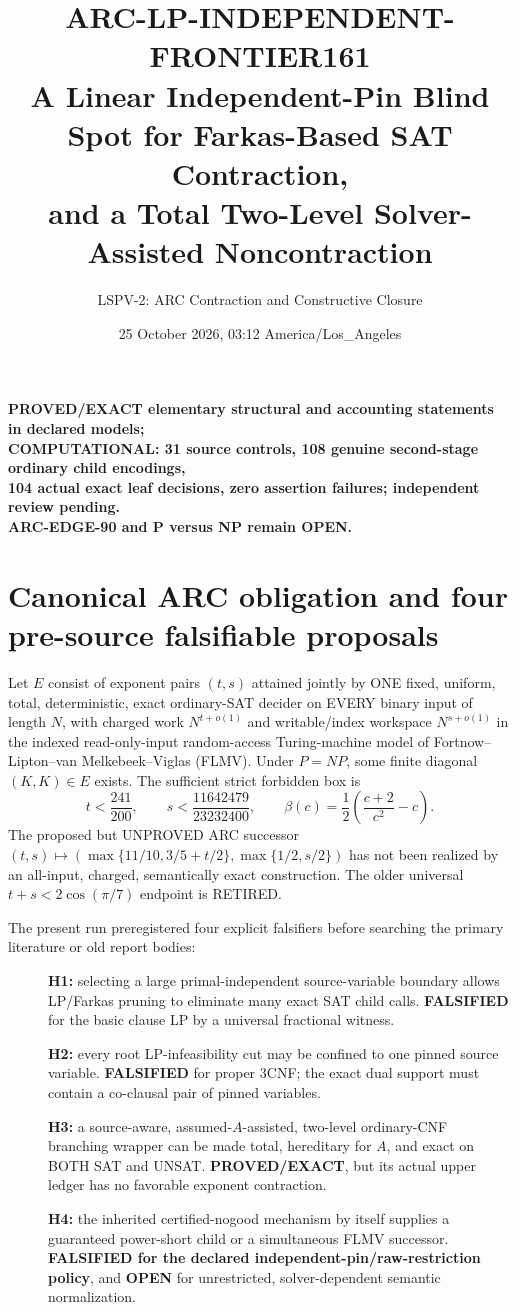 \documentclass[11pt]{article}
\title{ARC-LP-INDEPENDENT-FRONTIER161\\
\large A Linear Independent-Pin Blind Spot for Farkas-Based SAT Contraction,\\
and a Total Two-Level Solver-Assisted Noncontraction}
\author{LSPV-2: ARC Contraction and Constructive Closure}
\date{25 October 2026, 03:12 America/Los\_Angeles}
\begin{document}
\maketitle
\begin{center}
\textbf{PROVED/EXACT elementary structural and accounting statements in declared models;}\\
\textbf{COMPUTATIONAL: 31 source controls, 108 genuine second-stage ordinary child encodings,}\\
\textbf{104 actual exact leaf decisions, zero assertion failures; independent review pending.}\\
\textbf{ARC-EDGE-90 and P versus NP remain OPEN.}
\end{center}

\section{Canonical ARC obligation and four pre-source falsifiable proposals}
Let \(E\) consist of exponent pairs \((t,s)\) attained jointly by ONE fixed,
uniform, total, deterministic, exact ordinary-SAT decider on EVERY binary
input of length \(N\), with charged work \(N^{t+o(1)}\) and writable/index
workspace \(N^{s+o(1)}\) in the indexed read-only-input random-access
Turing-machine model of Fortnow--Lipton--van Melkebeek--Viglas
(FLMV). Under \(P=NP\), some finite diagonal \((K,K)\in E\) exists.
The sufficient strict forbidden box is
\[
t<\frac{241}{200},\qquad s<\frac{11642479}{23232400},\qquad
\beta(c)=\frac12\left(\frac{c+2}{c^2}-c\right).
\]
The proposed but UNPROVED ARC successor
\((t,s)\mapsto(\max\{11/10,3/5+t/2\},\max\{1/2,s/2\})\)
has not been realized by an all-input, charged, semantically exact
construction. The older universal \(t+s<2\cos(\pi/7)\) endpoint is RETIRED.

The present run preregistered four explicit falsifiers before searching
the primary literature or old report bodies:
\begin{description}
\item[] \textbf{H1:} selecting a large primal-independent source-variable
boundary allows LP/Farkas pruning to eliminate many exact SAT child calls.
\textbf{FALSIFIED} for the basic clause LP by a universal fractional witness.
\item[] \textbf{H2:} every root LP-infeasibility cut may be confined to one
pinned source variable. \textbf{FALSIFIED} for proper 3CNF; the exact dual
support must contain a co-clausal pair of pinned variables.
\item[] \textbf{H3:} a source-aware, assumed-\(A\)-assisted, two-level
ordinary-CNF branching wrapper can be made total, hereditary for \(A\),
and exact on BOTH SAT and UNSAT. \textbf{PROVED/EXACT}, but its actual
upper ledger has no favorable exponent contraction.
\item[] \textbf{H4:} the inherited certified-nogood mechanism by itself
supplies a guaranteed power-short child or a simultaneous FLMV successor.
\textbf{FALSIFIED for the declared independent-pin/raw-restriction policy},
and \textbf{OPEN} for unrestricted, solver-dependent semantic normalization.
\end{description}
\end{document}
